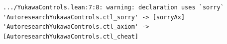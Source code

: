 \begin{Verbatim}[fontsize=\scriptsize,frame=single,framesep=1.5mm]
.../YukawaControls.lean:7:8: warning: declaration uses `sorry`
'AutoresearchYukawaControls.ctl_sorry' -> [sorryAx]
'AutoresearchYukawaControls.ctl_axiom' -> [AutoresearchYukawaControls.ctl_cheat]
\end{Verbatim}
